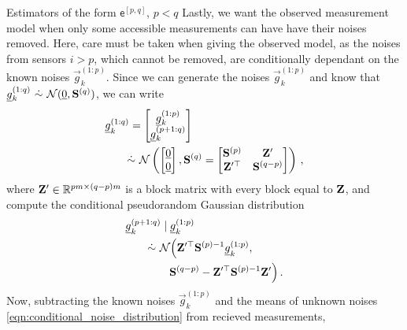 \documentclass[conference]{IEEEtran}
\theoremstyle{definition}
\theoremstyle{remark}
\begin{document}
\begin{LaTeXdescription}
  \item[Estimators of the form $\mathsf{e}^{[p,q]}$, $p<q$] Lastly, we want the observed measurement model when only some accessible measurements can have have their noises removed. Here, care must be taken when giving the observed model, as the noises from sensors $i>p$, which cannot be removed, are conditionally dependant on the known noises $\vec{g}_k^{(1:p)}$. Since we can generate the noises $\vec{g}_k^{(1:p)}$ and know that $\vec{g}_k^{(1:q)}\ \dot{\sim}\ \mathcal{N}(\vec{0}, \mat{S}^{(q)})$, we can write 
  \begin{equation}\label{eqn:block_noises_and_correlation}
    \begin{split}
      &\vec{g}_k^{(1:q)}=
      \begin{bmatrix}
        \vec{g}_k^{(1:p)}\\
        \vec{g}_k^{(p+1:q)}\\
      \end{bmatrix}\\ 
      &\qquad \dot{\sim}\ \mathcal{N}\left(
      \begin{bmatrix}
        \vec{0}\\
        \vec{0}
      \end{bmatrix},\mat{S}^{(q)}=
      \begin{bmatrix}
        \mat{S}^{(p)} & \mat{Z}^\prime\\
        \mat{Z}^{\prime\top} & \mat{S}^{(q-p)}
      \end{bmatrix}\right)\,,
    \end{split}
  \end{equation}
  where ${{\mathbf{Z}}}^\prime \in \mathbb{R}^{pm \times (q-p)m}$ is a block matrix with every block equal to ${{\mathbf{Z}}}$, and compute the conditional pseudorandom Gaussian distribution
  \begin{equation}\label{eqn:conditional_noise_distribution}
    \begin{split}
      &\vec{g}_k^{(p+1:q)} \mid \vec{g}_k^{(1:p)}\\
      &\qquad \dot{\sim}\ \mathcal{N}\Big(\mat{Z}^{\prime\top}\mat{S}^{(p)-1}\vec{g}_k^{(1:p)},\\
      &\qquad\qquad \mat{S}^{(q-p)} - \mat{Z}^{\prime\top}\mat{S}^{(p)-1}\mat{Z}^{\prime}\Big)\,.
    \end{split}
  \end{equation}
  Now, subtracting the known noises $\vec{g}_k^{(1:p)}$ and the means of unknown noises \eqref{eqn:conditional_noise_distribution} from recieved measurements,

\end{LaTeXdescription}
\end{document}
